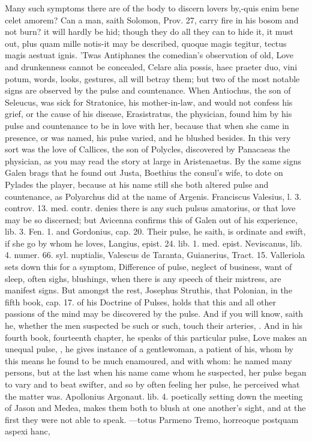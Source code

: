 Many such symptoms there are of the body to discern lovers by,-quis
enim bene celet amorem? Can a man, saith Solomon, Prov.  27, carry
fire in his bosom and not burn? it will hardly be hid; though they do
all they can to hide it, it must out, plus quam mille notis-it may be
described, quoque magis tegitur, tectus magis aestuat ignis.
'Twas Antiphanes the comedian's observation of old, Love and
drunkenness cannot be concealed, Celare alia possis, haec praeter duo,
vini potum, \etc{} words, looks, gestures, all will betray them; but two
of the most notable signs are observed by the pulse and countenance.
When Antiochus, the son of Seleucus, was sick for Stratonice, his
mother-in-law, and would not confess his grief, or the cause of his
disease, Erasistratus, the physician, found him by his pulse and
countenance to be in love with her, because that when she came in
presence, or was named, his pulse varied, and he blushed besides. In
this very sort was the love of Callices, the son of Polycles,
discovered by Panacaeas the physician, as you may read the story at
large in Aristenaetus. By the same signs Galen brags that he
found out Justa, Boethius the consul's wife, to dote on Pylades the
player, because at his name still she both altered pulse and
countenance, as  Polyarchus did at the name of Argenis.
Franciscus Valesius, l. 3. controv. 13. med. contr. denies there is any
such pulsus amatorius, or that love may be so discerned; but Avicenna
confirms this of Galen out of his experience, lib. 3. Fen. 1. and
Gordonius, cap. 20. Their pulse, he saith, is ordinate and swift,
if she go by whom he loves, Langius, epist. 24. lib. 1. med. epist.
Neviscanus, lib. 4. numer. 66. syl. nuptialis, Valescus de Taranta,
Guianerius, Tract. 15. Valleriola sets down this for a symptom,
Difference of pulse, neglect of business, want of sleep, often
sighs, blushings, when there is any speech of their mistress, are
manifest signs. But amongst the rest, Josephus Struthis, that Polonian,
in the fifth book, cap. 17. of his Doctrine of Pulses, holds that this
and all other passions of the mind may be discovered by the pulse.
And if you will know, saith he, whether the men suspected be such
or such, touch their arteries, \etc{}. And in his fourth book, fourteenth
chapter, he speaks of this particular pulse,  Love makes an
unequal pulse, \etc{}, he gives instance of a gentlewoman, a patient
of his, whom by this means he found to be much enamoured, and with
whom: he named many persons, but at the last when his name came whom he
suspected, her pulse began to vary and to beat swifter, and so by
often feeling her pulse, he perceived what the matter was. Apollonius
Argonaut. lib. 4. poetically setting down the meeting of Jason and
Medea, makes them both to blush at one another's sight, and at the
first they were not able to speak.
---totus Parmeno
Tremo, horreoque postquam aspexi hanc,

